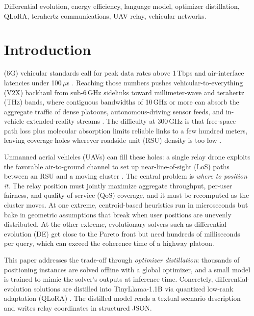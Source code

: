 \documentclass[journal]{IEEEtran}
\begin{document}
\begin{IEEEkeywords}
Differential evolution, energy efficiency, language model, optimizer distillation, QLoRA, terahertz communications, UAV relay, vehicular networks.
\end{IEEEkeywords}


\section{Introduction}
\label{sec:introduction}

 (6G) vehicular standards call for peak data rates above 1\,Tbps and air-interface latencies under 100\,$\mu$s \cite{rappaport2019}. Reaching those numbers pushes vehicular-to-everything (V2X) backhaul from sub-6\,GHz sidelinks toward millimeter-wave and terahertz (THz) bands, where contiguous bandwidths of 10\,GHz or more can absorb the aggregate traffic of dense platoons, autonomous-driving sensor feeds, and in-vehicle extended-reality streams \cite{akyildiz2022, chaccour2022}. The difficulty at 300\,GHz is that free-space path loss plus molecular absorption limits reliable links to a few hundred meters, leaving coverage holes wherever roadside unit (RSU) density is too low \cite{sarieddeen2021}.

Unmanned aerial vehicles (UAVs) can fill these holes: a single relay drone exploits the favorable air-to-ground channel to set up near-line-of-sight (LoS) paths between an RSU and a moving cluster \cite{zeng2016wireless}. The central problem is \emph{where to position it}. The relay position must jointly maximize aggregate throughput, per-user fairness, and quality-of-service (QoS) coverage, and it must be recomputed as the cluster moves. At one extreme, centroid-based heuristics \cite{zeng2016throughput} run in microseconds but bake in geometric assumptions that break when user positions are unevenly distributed. At the other extreme, evolutionary solvers such as differential evolution (DE) \cite{storn1997} get close to the Pareto front but need hundreds of milliseconds per query, which can exceed the coherence time of a highway platoon.

This paper addresses the trade-off through \emph{optimizer distillation}: thousands of positioning instances are solved offline with a global optimizer, and a small model is trained to mimic the solver's outputs at inference time. Concretely, differential-evolution solutions are distilled into TinyLlama-1.1B \cite{zhang2024tinyllama} via quantized low-rank adaptation (QLoRA) \cite{dettmers2023qlora}. The distilled model reads a textual scenario description and writes relay coordinates in structured JSON.
\end{document}

